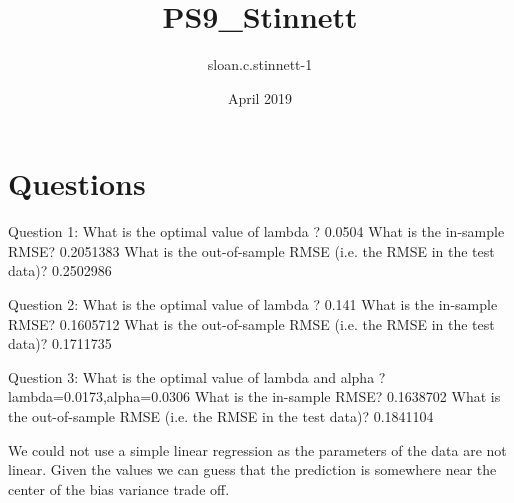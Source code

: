 \documentclass{article}
\title{PS9_Stinnett}
\author{sloan.c.stinnett-1 }
\date{April 2019}
\begin{document}
\maketitle

\section{Questions}
Question 1:
What is the optimal value of lambda ? 
0.0504
What is the in-sample RMSE?
0.2051383
What is the out-of-sample RMSE (i.e. the RMSE in the test data)?
0.2502986

Question 2:
What is the optimal value of lambda ? 
0.141
What is the in-sample RMSE?
0.1605712
What is the out-of-sample RMSE (i.e. the RMSE in the test data)?
0.1711735

Question 3:
What is the optimal value of lambda and alpha ? 
lambda=0.0173,alpha=0.0306
What is the in-sample RMSE?
0.1638702
What is the out-of-sample RMSE (i.e. the RMSE in the test data)?
0.1841104

We could not use a simple linear regression as the parameters of the data are not linear. Given the values we can guess that the prediction is somewhere near the center of the bias variance trade off.
\end{document}
